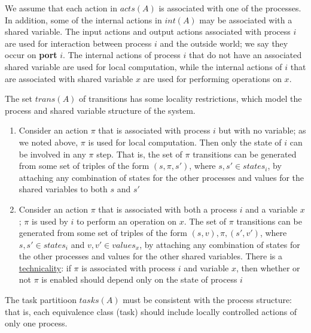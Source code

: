 \documentclass[11pt]{article}
\begin{document}
We assume that each action in \(acts(A)\) is associated with one of the processes. In addition, some
of the internal actions in \(int(A)\) may be associated with a shared variable. The input actions and
output actions associated with process \(i\) are used for interaction between process \(i\) and the
outside world; we say they occur on \textbf{port} \(i\). The internal actions of process \(i\) that do not have
an associated shared variable are used for local computation, while the internal actions of \(i\) that
are associated with shared variable \(x\) are used for performing operations on \(x\).

The set \(trans(A)\) of transitions has some locality restrictions, which model the process and shared
variable structure of the system.
\begin{enumerate}
\item Consider an action \(\pi\) that is associated with process \(i\) but with no variable; as we noted
above, \(\pi\) is used for local computation. Then only the state of \(i\) can be involved in any
\(\pi\) step. That is, the set of \(\pi\) transitions can be generated from some set of triples of
the form \((s,\pi,s')\), where \(s,s'\in states_i\), by attaching any combination of states for the
other processes and values for the shared variables to both \(s\) and \(s'\)
\item Consider an action \(\pi\) that is associated with both a process \(i\) and a variable \(x\);
\(\pi\) is used by \(i\) to perform an operation on \(x\). The set of \(\pi\) transitions can be
generated from some set of triples of the form \((s,v),\pi,(s',v')\), where \(s,s'\in states_i\)
and \(v,v'\in values_x\), by attaching any combination of states for the other processes and values
for the other shared variables. There is a \uline{technicality}: if \(\pi\) is associated with process
\(i\) and variable \(x\), then whether or not \(\pi\) is enabled should depend only on the state of
process \(i\)
\end{enumerate}

The task partitioon \(tasks(A)\) must be consistent with the process structure: that is, each
equivalence class (task) should include locally controlled actions of only one process.
\end{document}
